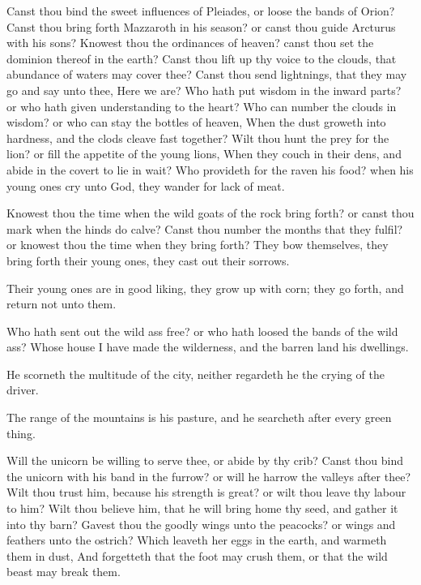 \Verse Canst thou bind the sweet influences of Pleiades, or loose the bands of Orion?  \Verse Canst thou bring forth Mazzaroth in his season?  or canst thou guide Arcturus with his sons?  \Verse Knowest thou the ordinances of heaven? canst thou set the dominion thereof in the earth?  \Verse Canst thou lift up thy voice to the clouds, that abundance of waters may cover thee?  \Verse Canst thou send lightnings, that they may go and say unto thee, Here we are?  \Verse Who hath put wisdom in the inward parts? or who hath given understanding to the heart?  \Verse Who can number the clouds in wisdom? or who can stay the bottles of heaven, \Verse When the dust groweth into hardness, and the clods cleave fast together?  \Verse Wilt thou hunt the prey for the lion? or fill the appetite of the young lions, \Verse When they couch in their dens, and abide in the covert to lie in wait?  \Verse Who provideth for the raven his food? when his young ones cry unto God, they wander for lack of meat.


\Chapter
\Verse Knowest thou the time when the wild goats of the rock bring forth? or canst thou mark when the hinds do calve?  \Verse Canst thou number the months that they fulfil? or knowest thou the time when they bring forth?  \Verse They bow themselves, they bring forth their young ones, they cast out their sorrows.

\Verse Their young ones are in good liking, they grow up with corn; they go forth, and return not unto them.

\Verse Who hath sent out the wild ass free? or who hath loosed the bands of the wild ass?  \Verse Whose house I have made the wilderness, and the barren land his dwellings.

\Verse He scorneth the multitude of the city, neither regardeth he the crying of the driver.

\Verse The range of the mountains is his pasture, and he searcheth after every green thing.

\Verse Will the unicorn be willing to serve thee, or abide by thy crib?  \Verse Canst thou bind the unicorn with his band in the furrow? or will he harrow the valleys after thee?  \Verse Wilt thou trust him, because his strength is great? or wilt thou leave thy labour to him?  \Verse Wilt thou believe him, that he will bring home thy seed, and gather it into thy barn?  \Verse Gavest thou the goodly wings unto the peacocks?  or wings and feathers unto the ostrich?  \Verse Which leaveth her eggs in the earth, and warmeth them in dust, \Verse And forgetteth that the foot may crush them, or that the wild beast may break them.

